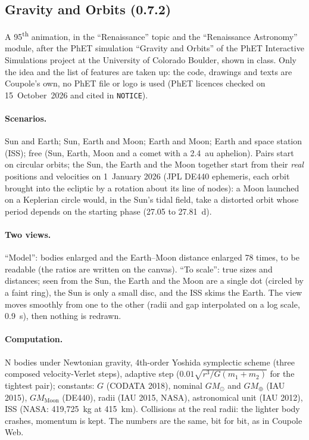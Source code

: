 \subsection{Gravity and Orbits (0.7.2)}\label{sec:gravite}
A 95\textsuperscript{th} animation, in the “Renaissance” topic and the “Renaissance Astronomy” module, after the PhET
simulation “Gravity and Orbits” of the PhET Interactive Simulations project at the University of Colorado Boulder,
shown in class. Only the idea and the list of features are taken up: the code, drawings and texts are Coupole's own,
no PhET file or logo is used (PhET licences checked on 15~October~2026 and cited in \texttt{NOTICE}).

\paragraph{Scenarios.} Sun and Earth; Sun, Earth and Moon; Earth and Moon; Earth and space station (ISS); free (Sun,
Earth, Moon and a comet with a 2.4~au aphelion). Pairs start on circular orbits; the Sun, the Earth and the Moon
together start from their \emph{real} positions and velocities on 1~January 2026 (JPL DE440 ephemeris, each orbit
brought into the ecliptic by a rotation about its line of nodes): a Moon launched on a Keplerian circle would, in the
Sun's tidal field, take a distorted orbit whose period depends on the starting phase (27.05 to 27.81~d).

\paragraph{Two views.} “Model”: bodies enlarged and the Earth--Moon distance enlarged 78 times, to be readable (the
ratios are written on the canvas). “To scale”: true sizes and distances; seen from the Sun, the Earth and the Moon are
a single dot (circled by a faint ring), the Sun is only a small disc, and the ISS skims the Earth. The view moves
smoothly from one to the other (radii and gap interpolated on a log scale, 0.9~s), then nothing is redrawn.

\paragraph{Computation.} N bodies under Newtonian gravity, 4th-order Yoshida symplectic scheme (three composed
velocity-Verlet steps), adaptive step ($0.01\sqrt{r^3/G(m_1+m_2)}$ for the tightest pair); constants: $G$ (CODATA
2018), nominal $GM_\odot$ and $GM_\oplus$ (IAU 2015), $GM_{\mathrm{Moon}}$ (DE440), radii (IAU 2015, NASA), astronomical unit (IAU
2012), ISS (NASA: 419,725~kg at 415~km). Collisions at the real radii: the lighter body crashes, momentum is kept.
The numbers are the same, bit for bit, as in Coupole Web.

